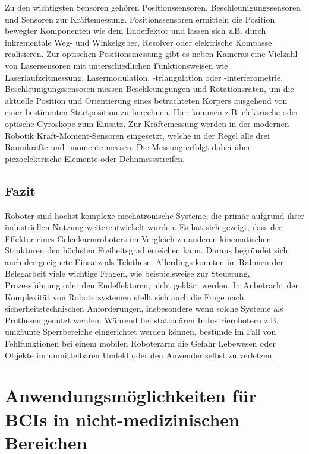 \documentclass[11pt,ngerman,parskip=half]{scrartcl}
\begin{document}
Zu den wichtigsten Sensoren gehören Positionssensoren,
Beschleunigungssensoren und Sensoren zur Kräftemessung. Positionssensoren
ermitteln die Position bewegter Komponenten wie dem Endeffektor und lassen sich
z.B. durch inkrementale Weg- und Winkelgeber, Resolver oder elektrische Kompasse
realisieren. Zur optischen Positionsmessung gibt es neben Kameras eine Vielzahl 
von Lasersensoren mit unterschiedlichen Funktionsweisen wie
Laserlaufzeitmessung, Lasermodulation, -triangulation oder -interferometrie.
Beschleunigungssensoren messen Beschleunigungen und Rotationsraten, um die
aktuelle Position und Orientierung eines betrachteten Körpers ausgehend von
einer bestimmten Startposition zu berechnen. Hier kommen z.B. elektrische
oder optische Gyroskope zum Einsatz. Zur Kräftemessung werden in der modernen
Robotik Kraft-Moment-Sensoren eingesetzt, welche in der Regel alle drei
Raumkräfte und -momente messen. Die Messung erfolgt dabei über
piezoelektrische Elemente oder Dehnmessstreifen.
\parencite[vgl.][98--117]{hesse_taschenbuch_2016}

\subsection{Fazit}
\label{subsec:john_fazit}
Roboter sind höchst komplexe mechatronische Systeme, die primär aufgrund
ihrer industriellen Nutzung weiterentwickelt wurden. Es hat sich gezeigt,
dass der Effektor eines Gelenkarmroboters im Vergleich zu anderen
kinematischen Strukturen den höchsten Freiheitsgrad erreichen kann. Daraus
begründet sich auch der geeignete Einsatz als Telethese. Allerdings konnten
im Rahmen der Belegarbeit viele wichtige Fragen, wie beispielsweise zur
Steuerung, Prozessführung oder den Endeffektoren, nicht geklärt werden. In
Anbetracht der Komplexität von Robotersystemen stellt sich auch die Frage
nach sicherheitstechnischen Anforderungen, insbesondere wenn solche Systeme
als Prothesen genutzt werden. Während bei stationären Industrierobotern z.B.
umzäunte Sperrbereiche eingerichtet werden können, bestünde im Fall von
Fehlfunktionen bei einem mobilen Roboterarm die Gefahr Lebewesen oder Objekte
im unmittelbaren Umfeld oder den Anwender selbst zu verletzen.

\section{Anwendungsmöglichkeiten für BCIs in nicht-medizinischen Bereichen}
\end{document}
